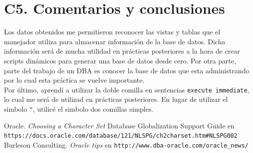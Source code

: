 \documentclass{article}
\begin{document}
\section*{C5. Comentarios y conclusiones}

Los datos obtenidos me permitieron reconocer las vistas y tablas que el manejador
utiliza para almacenar información de la base de datos. Dicha información
será de mucha utilidad en prácticas posteriores  a la hora de crear scripts 
dinámicos para generar una base de datos desde cero.
Por otra parte, parte del trabajo de un DBA es conocer la base de datos
que esta administrando por lo cual esta práctica se vuelve importante.\\ 

Por último, aprendí a utilizar la doble comilla en sentencias 
\texttt{execute immediate}, lo cual me será de utilizad en prácticas 
posteriores. En lugar de utilizar el simbolo \texttt{"}, utilicé el simbolo
dos comillas simples. 

\renewcommand\refname{Bibliografía y referencias}
\begin{thebibliography}{99}
     Oracle. \textit{Choosing a Character Set} 
    Database Globalization Support Guide en 
    \texttt{https://docs.oracle.com/database/121/NLSPG/ch2charset.htm\#NLSPG002}
     Burleson Consulting. \textit{Oracle tips } en 
    \texttt{http://www.dba-oracle.com/oracle\_news/}
\end{thebibliography}
\end{document}
